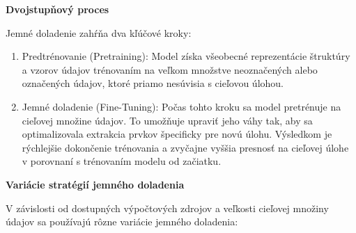 \documentclass[]{tukediphc}
\begin{document}
\textbf{Dvojstupňový proces}

Jemné doladenie zahŕňa dva kľúčové kroky:

\begin{enumerate}
 \item Predtrénovanie (Pretraining): Model získa všeobecné reprezentácie štruktúry a vzorov údajov trénovaním na veľkom množstve neoznačených alebo označených údajov, ktoré priamo nesúvisia s cieľovou úlohou.

\item Jemné doladenie (Fine-Tuning): Počas tohto kroku sa model pretrénuje na cieľovej množine údajov. To umožňuje upraviť jeho váhy tak, aby sa optimalizovala extrakcia prvkov špecificky pre novú úlohu\cite{researchgate:fine_tuning_transfer_learning}. Výsledkom je rýchlejšie dokončenie trénovania a zvyčajne vyššia presnosť na cieľovej úlohe v porovnaní s trénovaním modelu od začiatku. 
\end{enumerate}

\textbf{Variácie stratégií jemného doladenia}

V závislosti od dostupných výpočtových zdrojov a veľkosti cieľovej množiny údajov sa používajú rôzne variácie jemného doladenia:
\end{document}
